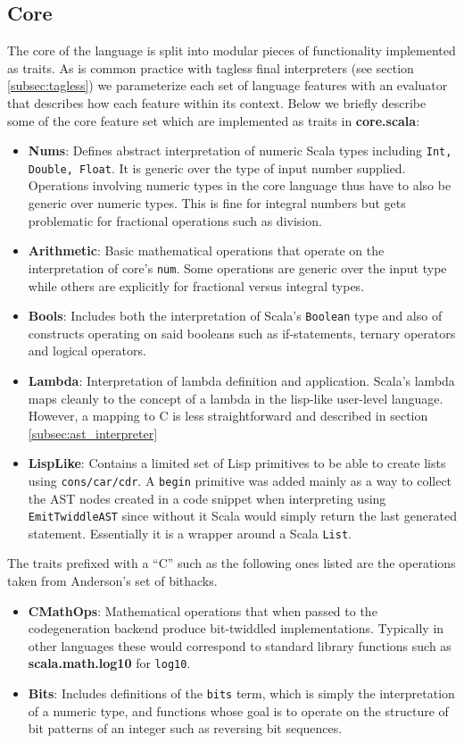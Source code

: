 \documentclass{article}
\begin{document}
\subsection{Core}
The core of the language is split into modular pieces of functionality implemented as traits. As is common practice with tagless final interpreters (see section \ref{subsec:tagless}) we parameterize each set of language features with an evaluator that describes how each feature within its context. Below we briefly describe some of the core feature set which are implemented as traits in \textbf{core.scala}:
\begin{itemize}
	\item \textbf{Nums}: Defines abstract interpretation of numeric Scala types including \texttt{Int, Double, Float}. It is generic over the type of input number supplied. Operations involving numeric types in the core language thus have to also be generic over numeric types. This is fine for integral numbers but gets problematic for fractional operations such as division.
	\item \textbf{Arithmetic}: Basic mathematical operations that operate on the interpretation of core's \texttt{num}. Some operations are generic over the input type while others are explicitly for fractional versus integral types.
	\item \textbf{Bools}: Includes both the interpretation of Scala's \texttt{Boolean} type and also of constructs operating on said booleans such as if-statements, ternary operators and logical operators.
	\item \textbf{Lambda}: Interpretation of lambda definition and application. Scala's lambda maps cleanly to the concept of a lambda in the lisp-like user-level language. However, a mapping to C is less straightforward and described in section \ref{subsec:ast_interpreter}
	\item \textbf{LispLike}: Contains a limited set of Lisp primitives to be able to create lists using \texttt{cons/car/cdr}. A \texttt{begin} primitive was added mainly as a way to collect the AST nodes created in a code snippet when interpreting using \texttt{EmitTwiddleAST} since without it Scala would simply return the last generated statement. Essentially it is a wrapper around a Scala \texttt{List}.
\end{itemize}

The traits prefixed with a ``C'' such as the following ones listed are the operations taken from Anderson's set of bithacks\cite{anderson2005bit}.
\begin{itemize}
	\item \textbf{CMathOps}: Mathematical operations that when passed to the codegeneration backend produce bit-twiddled implementations. Typically in other languages these would correspond to standard library functions such as \textbf{scala.math.log10} for \texttt{log10}.
	\item \textbf{Bits}: Includes definitions of the \texttt{bits} term, which is simply the interpretation of a numeric type, and functions whose goal is to operate on the structure of bit patterns of an integer such as reversing bit sequences.
\end{itemize}
\end{document}

